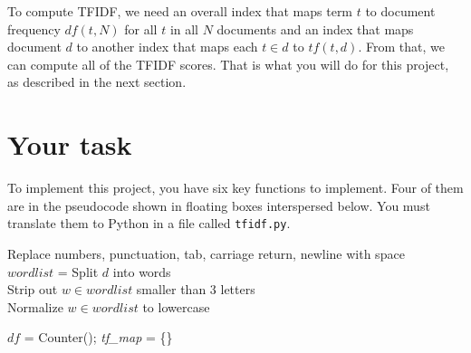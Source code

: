 \begin{fullwidth}
To compute TFIDF, we need an overall index that maps term $t$ to document frequency $df(t,N)$ for all $t$ in all $N$ documents and an index that maps document $d$ to another index that maps each $t \in d$ to $tf(t,d)$. From that, we can compute all of the TFIDF scores.  That is what you will do for this project, as described in the next section.

\section{Your task}

To implement this project, you have six key functions to implement.   Four of them are in the pseudocode shown in floating boxes interspersed below. You must translate them to Python in a file called {\tt tfidf.py}.

\begin{function}
\vspace{-4pt}
\Indp
 Replace numbers, punctuation, tab, carriage return, newline with space\\
 $wordlist$ = Split $d$ into words\\
 Strip out $w \in wordlist$ smaller than 3 letters\\
 Normalize $w \in wordlist$ to lowercase\\
\end{function}

\begin{function}
\vspace{-4pt}
\Indp
$df$ = Counter(); {\em tf\_map} = \{\}\\
\end{function}


\end{fullwidth}
